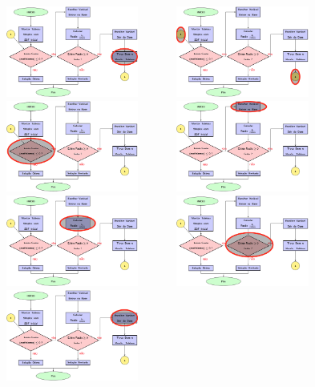 \begin{frame}
\begin{columns}
\begin{column}{0.5\textwidth}
{			}
			\only<7-8>
			{
				\includegraphics[width=5.5cm,height=3cm]{Alg_7.png}
			}
			\only<9>
			{
				\includegraphics[width=5.5cm,height=3cm]{Alg_9.png}
			}
			\only<10>
			{
				\includegraphics[width=5.5cm,height=3cm]{Alg_2.png}
			}
			\only<11>
			{
				\includegraphics[width=5.5cm,height=3cm]{Alg_3.png}
			}
			\only<12>
			{
				\includegraphics[width=5.5cm,height=3cm]{Alg_4.png}
			}
			\only<13>
			{
				\includegraphics[width=5.5cm,height=3cm]{Alg_5.png}
			}
			\only<14>
			{
				\includegraphics[width=5.5cm,height=3cm]{Alg_6.png}
}
\end{column}
\end{columns}
\end{frame}
